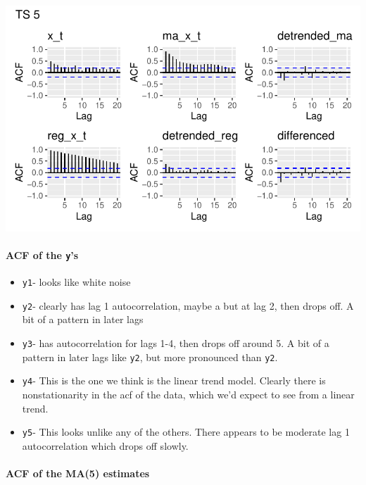 \documentclass[
  letterpaper,
  DIV=11,
  numbers=noendperiod]{scrartcl}
\let\oldparagraph\paragraph
\renewcommand{\paragraph}[1]{\oldparagraph{#1}\mbox{}}
\providecommand{\tightlist}{%
  \setlength{\itemsep}{0pt}\setlength{\parskip}{0pt}}\usepackage{longtable,booktabs,array}
\begin{document}
\includegraphics{Lecture7_files/figure-pdf/unnamed-chunk-22-5.pdf}

\paragraph{\texorpdfstring{ACF of the
\texttt{y}'s}{ACF of the y's}}\label{acf-of-the-ys}

\begin{itemize}
\tightlist
\item
  \texttt{y1}- looks like white noise
\item
  \texttt{y2}- clearly has lag 1 autocorrelation, maybe a but at lag 2,
  then drops off. A bit of a pattern in later lags
\item
  \texttt{y3}- has autocorrelation for lags 1-4, then drops off around
  5. A bit of a pattern in later lags like \texttt{y2}, but more
  pronounced than \texttt{y2}.
\item
  \texttt{y4}- This is the one we think is the linear trend model.
  Clearly there is nonstationarity in the acf of the data, which we'd
  expect to see from a linear trend.
\item
  \texttt{y5}- This looks unlike any of the others. There appears to be
  moderate lag 1 autocorrelation which drops off slowly.
\end{itemize}

\paragraph{ACF of the MA(5) estimates}\label{acf-of-the-ma5-estimates}
\end{document}
